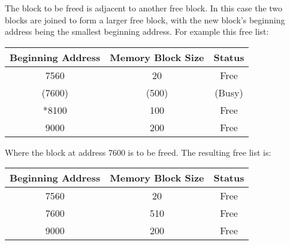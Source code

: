 \documentclass[12pt letter]{report}
\begin{document}
The block to be freed is adjacent to another free block. In this case the two blocks are joined to form a larger free block, with the new block's beginning address being the smallest beginning address. For example this free list:
\begin{table}[H]
  \begin{center}
    \begin{tabular}{|c c c|}
      \hline
      Beginning Address & Memory Block Size & Status \\ [0.5ex]
      \hline
      \hline
      7560              & 20                & Free   \\
      (7600)            & (500)             & (Busy) \\
      *8100             & 100               & Free   \\
      9000              & 200               & Free   \\
      \hline
    \end{tabular}
  \end{center}
\end{table}
Where the block at address 7600 is to be freed. The resulting free list is:
\begin{table}[H]
  \begin{center}
    \begin{tabular}{|c c c|}
      \hline
      Beginning Address & Memory Block Size & Status \\ [0.5ex]
      \hline
      \hline
      7560              & 20                & Free   \\
      7600              & 510               & Free   \\
      9000              & 200               & Free   \\
      \hline
    \end{tabular}
  \end{center}
\end{table}
\end{document}
